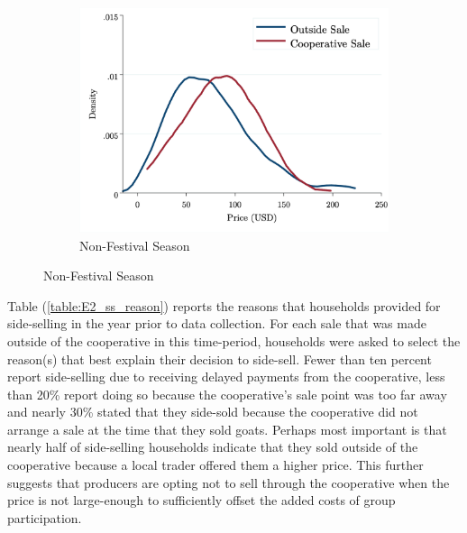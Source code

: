\documentclass[11pt]{article}
\begin{document}
\begin{figure}[H]
\begin{subfigure}[t]{0.4\textwidth}
    \end{subfigure}
    \hfill
    \begin{subfigure}[t]{0.4\textwidth}
        \centering
        \caption{Non-Festival Season} \label{figure:E2_PD_NonFest}
        \includegraphics[width=\linewidth,trim=4 4 4 4,clip]{E2_PriceDensity_NonFest.png} 
    \end{subfigure}
\end{figure}

Table (\ref{table:E2_ss_reason}) reports the reasons that households provided for side-selling in the year prior to data collection. For each sale that was made outside of the cooperative in this time-period, households were asked to select the reason(s) that best explain their decision to side-sell. Fewer than ten percent report side-selling due to receiving delayed payments from the cooperative, less than 20\% report doing so because the cooperative's sale point was too far away and nearly 30\% stated that they side-sold because the cooperative did not arrange a sale at the time that they sold goats. Perhaps most important is that nearly half of side-selling households indicate that they sold outside of the cooperative because a local trader offered them a higher price. This further suggests that producers are opting not to sell through the cooperative when the price is not large-enough to sufficiently offset the added costs of group participation.
\end{document}
